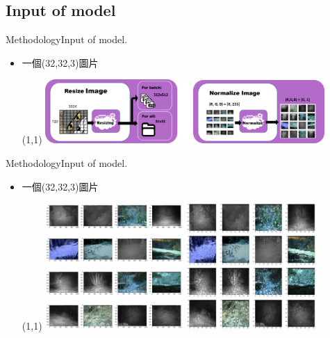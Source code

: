 \documentclass{beamer}
\begin{document}
\begin{CJK}{UTF8}{}
\subsection{Input of model}

\begin{frame}{Methodology}{Input of model}.
\vspace{-4.5cm}
	\begin{itemize}
	\item{
		一個(32,32,3)圖片
		\begin{textblock}{3}(1,1)
		\includegraphics[width=5.5cm]{resize.png}
		\includegraphics[width=5cm]{normalize.png}
		\end{textblock}
	}
	\end{itemize}
\end{frame}

\begin{frame}{Methodology}{Input of model}.
\vspace{-4.5cm}
	\begin{itemize}
	\item{
		一個(32,32,3)圖片
		\begin{textblock}{3}(1,1)
		\includegraphics[width=5.25cm]{origin.jpg}
		\includegraphics[width=5cm]{32_32_resize.jpg}
		\end{textblock}
	}
	\end{itemize}
\end{frame}


\end{CJK}
\end{document}
